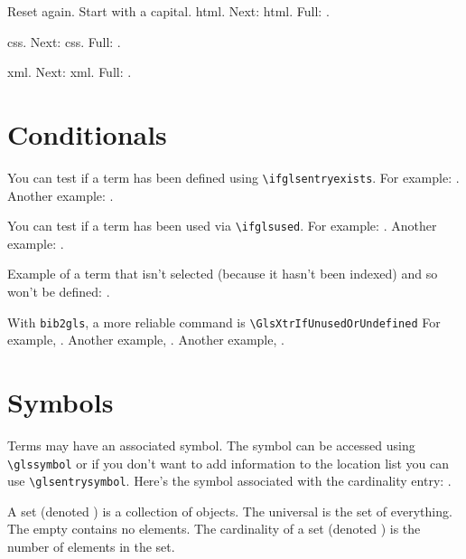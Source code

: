 \documentclass{book}
\newcommand*{\appname}[1]{\texttt{#1}}
\begin{document}
Reset again. \glsresetall[\glsxtrabbrvtype]
Start with a capital. \Gls{html}.
Next: \Gls{html}. Full: .

\Gls{css}. Next: \gls{css}. Full: .

\Gls{xml}. Next: \gls{xml}. Full: .

\section{Conditionals}

You can test if a term has been defined using \verb|\ifglsentryexists|.
For example: .
Another example: .

You can test if a term has been used via \verb|\ifglsused|.
For example: .
Another example: .

Example of a term that isn't selected (because it hasn't
been indexed) and so
won't be defined: .

With \appname{bib2gls}, a more reliable command is
\verb|\GlsXtrIfUnusedOrUndefined|
For example, .
Another example, .
Another example, .

\section{Symbols}

Terms may have an associated symbol. The symbol can be accessed
using \verb|\glssymbol| or if you don't want to add information to the
location list you can use \verb|\glsentrysymbol|. Here's the symbol
associated with the \gls{cardinality} entry:
.

A \gls{set} (denoted ) is a collection of objects.
The \gls{universal} is the set of everything.
The \gls{empty} contains no elements.
The \gls{cardinality} of a set (denoted ) is the
number of elements in the set.
\end{document}
